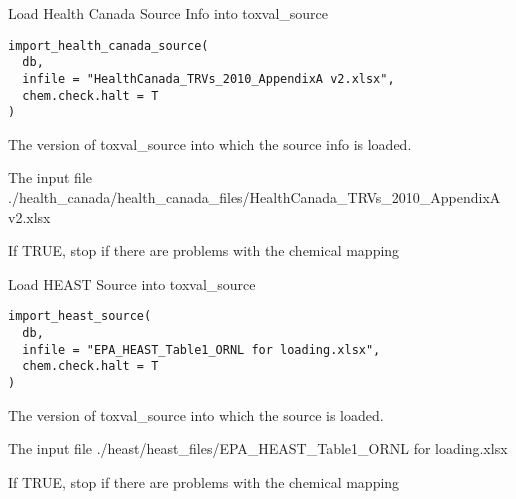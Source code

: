 \documentclass[letterpaper]{book}
\begin{document}
%
\begin{Description}\relax
Load Health Canada Source Info into toxval\_source
\end{Description}
%
\begin{Usage}
\begin{verbatim}
import_health_canada_source(
  db,
  infile = "HealthCanada_TRVs_2010_AppendixA v2.xlsx",
  chem.check.halt = T
)
\end{verbatim}
\end{Usage}
%
\begin{Arguments}
\begin{ldescription}
\item[\code{db}] The version of toxval\_source into which the source info is loaded.

\item[\code{infile}] The input file ./health\_canada/health\_canada\_files/HealthCanada\_TRVs\_2010\_AppendixA v2.xlsx

\item[\code{chem.check.halt}] If TRUE, stop if there are problems with the chemical mapping
\end{ldescription}
\end{Arguments}
%
\begin{Description}\relax
Load HEAST Source into toxval\_source
\end{Description}
%
\begin{Usage}
\begin{verbatim}
import_heast_source(
  db,
  infile = "EPA_HEAST_Table1_ORNL for loading.xlsx",
  chem.check.halt = T
)
\end{verbatim}
\end{Usage}
%
\begin{Arguments}
\begin{ldescription}
\item[\code{db}] The version of toxval\_source into which the source is loaded.

\item[\code{infile}] The input file ./heast/heast\_files/EPA\_HEAST\_Table1\_ORNL for loading.xlsx

\item[\code{chem.check.halt}] If TRUE, stop if there are problems with the chemical mapping
\end{ldescription}
\end{Arguments}
\end{document}
